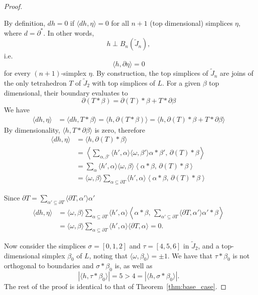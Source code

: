 \documentclass[11pt]{amsart}
\theoremstyle{theorem}
\theoremstyle{remark}
\theoremstyle{definition}
\newcommand {\la}   {{\langle}}
\newcommand {\ra}   {{\rangle}}
\newcommand{\HH}  {\mbox{\rm H}}
\begin{document}
\begin{proof}
\begin{itemize}
    By definition, 
    $dh=0$ if $\langle dh, \eta\rangle=0$  for all $n+1$ (top dimensional) simplices $\eta$, where $d = \partial^*$. 
In other words,
\[
h\perp B_n(\widetilde{J}_n),
\]
i.e.
\[
\langle h,\partial \eta\rangle=0
\]
for every \((n+1)\)-simplex \(\eta\).
    By construction, the top simplices of $\widetilde{J}_n$ are joins of the only tetrahedron $T$ of $\widetilde{J}_2$ with top simplices of $L$. For a given $\beta$ top dimensional, their boundary evaluates to
    \[
    \partial (T*\beta) = \partial(T)*\beta + T*\partial \beta
    \] 
    We have 
    \begin{align*}
        \langle dh, \eta\rangle &= \langle dh, T*\beta\rangle = \langle h, \partial(T*\beta)\rangle = \langle h,  \partial(T)*\beta + T*\partial \beta \rangle 
    \end{align*}
    By dimensionality, $\langle h, T*\partial \beta \rangle$ is zero, therefore  
    \begin{align*}
        \langle dh, \eta\rangle &= \langle h,  \partial(T)*\beta \rangle \\
        &=\left\langle \sum_{\alpha,\beta'}  \langle h',\alpha \rangle \langle \omega,\beta' \rangle \alpha * \beta',\,  \partial(T)*\beta \right\rangle\\
        &= \sum_{\alpha}  \langle h',\alpha \rangle \langle \omega,\beta \rangle \left\langle\alpha * \beta,\,  \partial(T)*\beta \right\rangle\\
        &= \langle \omega,\beta \rangle  \sum_{\alpha\subseteq \partial T}  \langle h',\alpha \rangle \left\langle \alpha * \beta,\,  \partial(T)*\beta \right\rangle
    \end{align*}

    Since $\partial T = \sum_{\alpha'\subseteq \partial T} \langle \partial T, \alpha'\rangle \alpha'$
\begin{align*}
        \langle dh, \eta\rangle &= \langle \omega,\beta \rangle  \sum_{\alpha\subseteq \partial T}  \langle h',\alpha \rangle \left\langle \alpha * \beta,\,  \sum_{\alpha'\subseteq \partial T} \langle \partial T, \alpha'\rangle \alpha'*\beta \right\rangle\\
        &= \langle \omega,\beta \rangle  \sum_{\alpha\subseteq \partial T}  \langle h',\alpha \rangle \langle \partial T, \alpha \rangle =0.
\end{align*}
\end{itemize}

Now consider the simplices $\sigma = [0,1,2]$ and $\tau = [4,5,6]$ in $\widetilde{J}_2$, and a top-dimensional simplex $\beta_0$ of $L$, noting that $\la \omega,\beta_0\ra = \pm 1$. We have that $\tau * \beta_0$ is not orthogonal to boundaries and $\sigma *\beta_0$ is, as well as 
\[
|\langle h, \tau*\beta_0 \rangle| = 5 > 4 = |\langle h, \sigma*\beta_0 \rangle|.
\]
The rest of the proof is identical to that of Theorem~\ref{thm:base_case}.
\end{proof}
\end{document}
